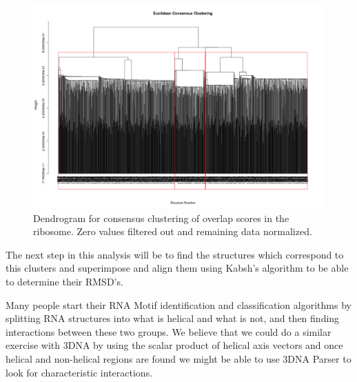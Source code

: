 \begin{figure}[htbp]
\centering 
\includegraphics[angle=90, scale=0.6]{Chapter5/eucli_cons.png}
\caption{Dendrogram for consensus clustering of overlap scores in the ribosome.
Zero values filtered out and remaining data normalized.}
\end{figure}

The next step in this analysis will be to find the structures which
correspond to this clusters and superimpose and align them using
Kabsh's algorithm to be able to determine their RMSD's.

Many people start their RNA Motif identification and classification
algorithms by splitting RNA structures into what is helical and what
is not, and then finding interactions between these two groups. We
believe that we could do a similar exercise with 3DNA by using the scalar
product of helical axis vectors and once helical and non-helical
regions are found we might be able to use 3DNA Parser to look for characteristic
interactions.





